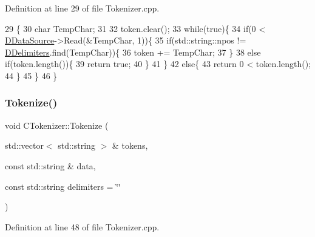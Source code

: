 Definition at line 29 of file Tokenizer.\+cpp.


\begin{DoxyCode}
29                                      \{
30     \textcolor{keywordtype}{char} TempChar;
31     
32     token.clear();
33     \textcolor{keywordflow}{while}(\textcolor{keyword}{true})\{
34         \textcolor{keywordflow}{if}(0 < \hyperlink{classCTokenizer_aaa6faab432000d3f942a0c14fc09f60b}{DDataSource}->Read(&TempChar, 1))\{
35             \textcolor{keywordflow}{if}(std::string::npos != \hyperlink{classCTokenizer_ad1edcf297f5f9ccf43dc32a992556f52}{DDelimiters}.find(TempChar))\{
36                 token += TempChar;
37             \}
38             \textcolor{keywordflow}{else} \textcolor{keywordflow}{if}(token.length())\{
39                 \textcolor{keywordflow}{return} \textcolor{keyword}{true};
40             \}
41         \}
42         \textcolor{keywordflow}{else}\{
43             \textcolor{keywordflow}{return} 0 < token.length();
44         \}
45     \}
46 \}
\end{DoxyCode}
\hypertarget{classCTokenizer_a7477f6849a3d0a5154879d8622e4012c}{}\label{classCTokenizer_a7477f6849a3d0a5154879d8622e4012c} 
\subsubsection{\texorpdfstring{Tokenize()}{Tokenize()}}
{\footnotesize\ttfamily void C\+Tokenizer\+::\+Tokenize (\begin{DoxyParamCaption}\item[{std\+::vector$<$ std\+::string $>$ \&}]{tokens,  }\item[{const std\+::string \&}]{data,  }\item[{const std\+::string}]{delimiters = {\ttfamily \char`\"{}\char`\"{}} }\end{DoxyParamCaption})\hspace{0.3cm}{\ttfamily [static]}}



Definition at line 48 of file Tokenizer.\+cpp.


